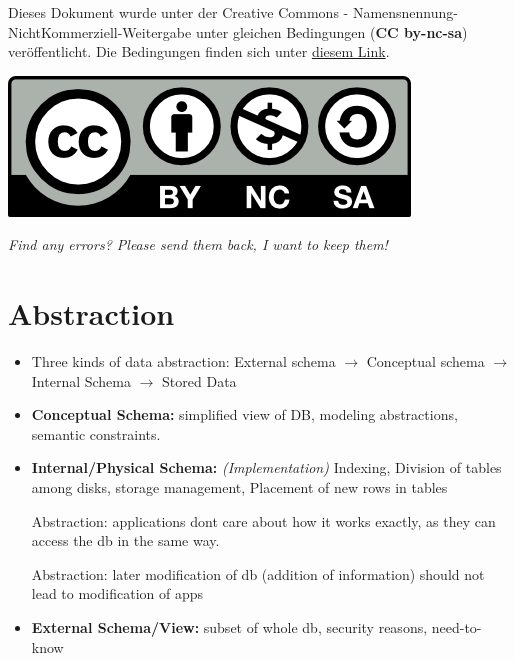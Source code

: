 \documentclass{scrartcl}
\begin{document}

\begin{shaded}
Dieses Dokument wurde unter der Creative Commons - Namensnennung-NichtKommerziell-Weitergabe unter gleichen Bedingungen (\textbf{CC by-nc-sa}) veröffentlicht. Die Bedingungen finden sich unter \href{http://creativecommons.org/licenses/by-nc-sa/3.0/de}{diesem Link}. \\
\centerline{\includegraphics[scale=1]{../cc-by-nc-sa.png} }
\end{shaded}

\textit{Find any errors? Please send them back, I want to keep them!}

\section*{Abstraction}
\begin{itemize}
	\item Three kinds of data abstraction: External schema $\to$ Conceptual schema  $\to$ Internal Schema  $\to$ Stored Data
	\item \textbf{Conceptual Schema:} simplified view of DB, modeling abstractions, semantic constraints.
	\item \textbf{Internal/Physical Schema:} \textit{(Implementation)} Indexing, Division of tables among disks, storage management, Placement of new rows in tables
	\item[Abstraction:] applications dont care about how it works exactly, as they can access the db in the same way.
	\item[Abstraction:] later modification of db (addition of information) should not lead to modification of apps
	\item \textbf{External Schema/View:} subset of whole db, security reasons, need-to-know
\end{itemize}
\end{document}
